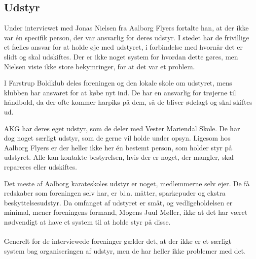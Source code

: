 \subsection*{Udstyr}
Under interviewet med Jonas Nielsen fra Aalborg Flyers fortalte han, at der ikke var én specifik person, der var ansvarlig for deres udstyr. I stedet har de frivillige et fælles ansvar for at holde øje med udstyret, i forbindelse med hvornår det er slidt og skal udskiftes. Der er ikke noget system for hvordan dette gøres, men Nielsen viste ikke store bekymringer, for at det var et problem.
\par
I Farstrup Boldklub deles foreningen og den lokale skole om udstyret, mens klubben har ansvaret for at købe nyt ind. De har en ansvarlig for trøjerne til håndbold, da der ofte kommer harpiks på dem, så de bliver ødelagt og skal skiftes ud.
\par
AKG har deres eget udstyr, som de deler med Vester Mariendal Skole. De har dog noget særligt udstyr, som de gerne vil holde under opsyn. Ligesom hos Aalborg Flyers er der heller ikke her én bestemt person, som holder styr på udstyret. Alle kan kontakte bestyrelsen, hvis der er noget, der mangler, skal repareres eller udskiftes. 
\par
Det meste af Aalborg karateskoles udstyr er noget, medlemmerne selv ejer. De få redskaber som foreningen selv har, er bl.a. måtter, sparkepuder og ekstra beskyttelsesudstyr. Da omfanget af udstyret er småt, og vedligeholdelsen er minimal, mener foreningens formand, Mogens Juul Møller, ikke at det har været nødvendigt at have et system til at holde styr på disse.
\\\\
Generelt for de interviewede foreninger gælder det, at der ikke er et særligt system bag organiseringen af udstyr, men de har heller ikke problemer med det. 

